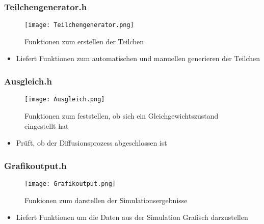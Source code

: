 \documentclass{beamer}
\begin{document}
\begin{frame} %
  \frametitle{Teilchengenerator.h} %
  \begin{figure}
		\centering
		\texttt{[image: Teilchengenerator.png]}
		\caption{Funktionen zum erstellen der Teilchen}
  \end{figure}
  \begin{itemize}
  	\item Liefert Funktionen zum automatischen und manuellen generieren der Teilchen
  \end{itemize}
\end{frame}

\begin{frame} %
  \frametitle{Ausgleich.h} %
  \begin{figure}
		\centering
		\texttt{[image: Ausgleich.png]}
		\caption{Funktionen zum feststellen, ob sich ein Gleichgewichtszustand eingestellt hat}
  \end{figure}
  \begin{itemize}
  	\item Prüft, ob der Diffusionsprozess abgeschlossen ist
  \end{itemize}
\end{frame}

\begin{frame} %
  \frametitle{Grafikoutput.h} %
  \begin{figure}
		\centering
		\texttt{[image: Grafikoutput.png]}
		\caption{Funkionen zum darstellen der Simulationsergebnisse}
  \end{figure}
  \begin{itemize}
  	\item Liefert Funktionen um die Daten aus der Simulation Grafisch darzustellen
  \end{itemize}
\end{frame}
\end{document}
